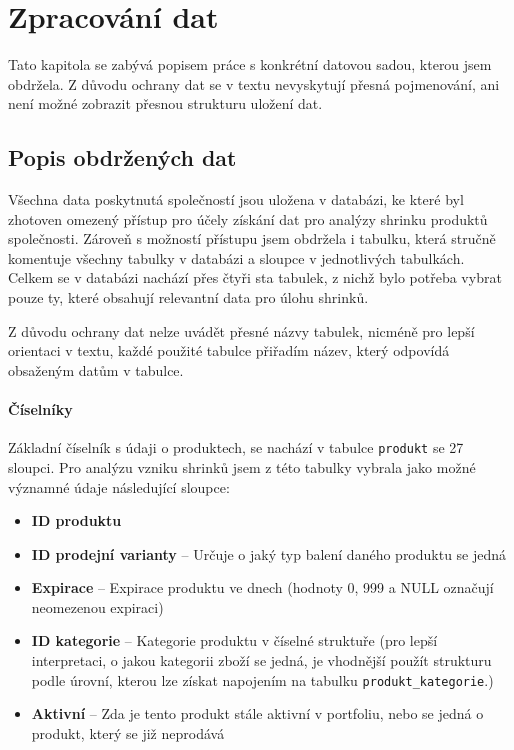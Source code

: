 \chapter{Zpracování dat}

Tato kapitola se zabývá popisem práce s konkrétní datovou sadou, kterou jsem obdržela. Z důvodu ochrany dat se v textu nevyskytují přesná pojmenování, ani není možné zobrazit přesnou strukturu uložení dat. 

\section{Popis obdržených dat}

Všechna data poskytnutá společností jsou uložena v databázi, ke které byl zhotoven omezený přístup pro účely získání dat pro analýzy shrinku produktů společnosti. Zároveň s možností přístupu jsem obdržela i tabulku, která stručně komentuje všechny tabulky v databázi a sloupce v jednotlivých tabulkách. Celkem se v databázi nachází přes čtyři sta tabulek, z nichž bylo potřeba vybrat pouze ty, které obsahují relevantní data pro úlohu shrinků.

Z důvodu ochrany dat nelze uvádět přesné názvy tabulek, nicméně pro lepší orientaci v textu, každé použité tabulce přiřadím název, který odpovídá obsaženým datům v tabulce.

\subsubsection{Číselníky}

Základní číselník s údaji o produktech, se nachází v tabulce \texttt{produkt} se 27 sloupci. Pro analýzu vzniku shrinků jsem z této tabulky vybrala jako možné významné údaje následující sloupce:

\begin{itemize}
    \itemsep0em 
    \item \textbf{ID produktu}
    \item \textbf{ID prodejní varianty} -- Určuje o jaký typ balení daného produktu se jedná    
    \item \textbf{Expirace} -- Expirace produktu ve dnech (hodnoty 0, 999 a NULL označují neomezenou expiraci)
    \item \textbf{ID kategorie} -- Kategorie produktu v číselné struktuře (pro lepší interpretaci, o jakou kategorii zboží se jedná, je vhodnější použít strukturu podle úrovní, kterou lze získat napojením na tabulku \texttt{produkt\_kategorie}.)
    \item \textbf{Aktivní} --  Zda je tento produkt stále aktivní v portfoliu, nebo se jedná o produkt, který se již neprodává
\end{itemize}

